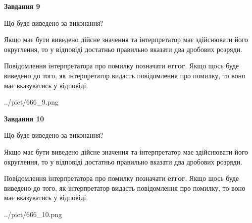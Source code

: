 \documentclass[12pt, ukrainian]{article}
\begin{document}
{\begin {Large}
{\begin {center}\textbf{Завдання 9}\end {center}}\par
Що буде виведено за виконання? \par

Якщо має бути виведено дійсне значення та інтерпретатор має здійснювати його округлення, 
то у відповіді достатньо правильно вказати два дробових розряди.

Повідомлення інтерпретатора про помилку позначати \textbf{error}.
Якщо щось буде виведено до того, як інтерпретатор видасть повідомлення про помилку, 
то воно має вказуватись у відповіді. \par

\begin{center}
	{../pict/666_9.png}
\end{center}
\newpage

{\begin {center}\textbf{Завдання 10}\end {center}}\par
Що буде виведено за виконання? \par

Якщо має бути виведено дійсне значення та інтерпретатор має здійснювати його округлення, 
то у відповіді достатньо правильно вказати два дробових розряди.

Повідомлення інтерпретатора про помилку позначати \textbf{error}.
Якщо щось буде виведено до того, як інтерпретатор видасть повідомлення про помилку, 
то воно має вказуватись у відповіді. \par

\begin{center}
	{../pict/666_10.png}
\end{center}
\newpage

\end {Large}}
\end{document}
